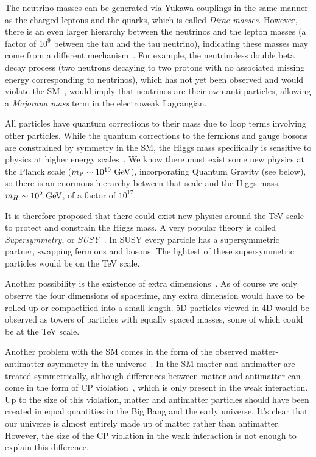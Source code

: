 The neutrino masses can be generated via Yukawa couplings in the same manner as the charged leptons and the quarks, which is called \textit{Dirac masses}.
However, there is an even larger hierarchy between the neutrinos and the lepton masses (a factor of $10^9$ between the tau and the tau neutrino), indicating these masses may come from a different mechanism~\cite{King:2003jb}.
For example, the neutrinoless double beta decay process (two neutrons decaying to two protons with no associated missing energy corresponding to neutrinos), which has not yet been observed and would violate the SM~\cite{Schwingenheuer:2012zs}, would imply that neutrinos are their own anti-particles, allowing a \textit{Majorana mass} term in the electroweak Lagrangian.

All particles have quantum corrections to their mass due to loop terms involving other particles.
While the quantum corrections to the fermions and gauge bosons are constrained by symmetry in the SM, the Higgs mass specifically is sensitive to physics at higher energy scales~\cite{Csaki:2016kln,deGouvea:2014xba,Nilles:1982dy}.
We know there must exist some new physics at the Planck scale ($m_\text{P}\sim10^{19}~\mathrm{GeV}$), incorporating Quantum Gravity (see below), so there is an enormous hierarchy between that scale and the Higgs mass, $m_H\sim 10^2~\mathrm{GeV}$, of a factor of $10^{17}$.

It is therefore proposed that there could exist new physics around the TeV scale to protect and constrain the Higgs mass.
A very popular theory is called \textit{Supersymmetry}, or \textit{SUSY}~\cite{wess_bagger_2009,Wess:1984jr,Lykken:1996xt,Quevedo:2010ui,Strassler:2003qg,Peskin:1997qi,Seiberg:1994pq,Intriligator:2007cp,Dobrescu:2000yn,Ellwanger:2003jt,Dermisek:2005ar,Chang:2008cw,Morrissey:2008gm}.
In SUSY every particle has a supersymmetric partner, swapping fermions and bosons.
The lightest of these supersymmetric particles would be on the TeV scale.

Another possibility is the existence of extra dimensions~\cite{Kaluza:1921tu,Klein:1926tv,Einstein:1938fk,Csaki:2004ay,Csaki:2005vy,Rattazzi:2003ea,Ponton:2012bi,Cheng:2010pt}.
As of course we only observe the four dimensions of spacetime, any extra dimension would have to be rolled up or compactified into a small length.
5D particles viewed in 4D would be observed as towers of particles with equally spaced masses, some of which could be at the TeV scale.

Another problem with the SM comes in the form of the observed matter-antimatter asymmetry in the universe~\cite{Canetti:2012zc}.
In the SM matter and antimatter are treated symmetrically, although differences between matter and antimatter can come in the form of CP violation~\cite{Sakharov:1967dj}, which is only present in the weak interaction.
Up to the size of this violation, matter and antimatter particles should have been created in equal quantities in the Big Bang and the early universe.
It's clear that our universe is almost entirely made up of matter rather than antimatter.
However, the size of the CP violation in the weak interaction is not enough to explain this difference.

